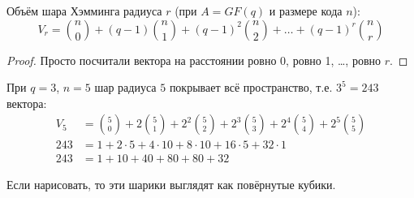 \begin{lemma}
	Объём шара Хэмминга радиуса $r$ (при $A=GF(q)$ и размере кода $n$):
	\[
		V_r = \binom{n}{0} + (q-1)\binom{n}{1} + (q-1)^2\binom{n}{2} + \dots + (q-1)^r\binom{n}{r}
	\]
\end{lemma}
\begin{proof}
	Просто посчитали вектора на расстоянии ровно 0, ровно 1, \dots, ровно $r$.
\end{proof}
\begin{exmp}
	При $q=3$, $n=5$ шар радиуса $5$ покрывает всё пространство, т.е. $3^5=243$ вектора:
	\begin{align*}
		V_5 &= \binom{5}{0} + 2\binom{5}{1} + 2^2\binom{5}{2} + 2^3\binom{5}{3} + 2^4\binom{5}{4} + 2^5\binom{5}{5} \\
		243 &= 1 + 2\cdot5 + 4\cdot10 + 8\cdot10 + 16\cdot5 + 32\cdot1 \\
		243 &= 1 + 10 + 40 + 80 + 80 + 32
	\end{align*}
\end{exmp}
\begin{Rem}
	Если нарисовать, то эти шарики выглядят как повёрнутые кубики.
\end{Rem}
